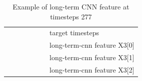 \begin{table}[]
\begin{tabular}{llllllllllll}
                                                      &                                                  &                                                  &                                                &                                                  & \cellcolor[HTML]{34FF34}                         & \multicolumn{6}{l}{target timesteps}                                                                                                                                                                                                                                                                             \\
                                                      &                                                  &                                                  &                                                &                                                  & \cellcolor[HTML]{38FFF8}                         & \multicolumn{6}{l}{long-term-cnn feature X3{[}0{]}}                                                                                                                                                                                                                                                             \\
                                                      &                                                  &                                                  &                                                &                                                  & \cellcolor[HTML]{68CBD0}                         & \multicolumn{6}{l}{long-term-cnn feature X3{[}1{]}}                                                                                                                                                                                                                                                             \\
                                                      &                                                  &                                                  &                                                &                                                  & \cellcolor[HTML]{34696D}                         & \multicolumn{6}{l}{long-term-cnn feature X3{[}2{]}}                                                                                                                                                                                                                                                            
    \end{tabular}
    \caption{Example of long-term CNN feature at timesteps 277}
    \label{tab:Example-long-term-cnn-feature}
    \end{table}

